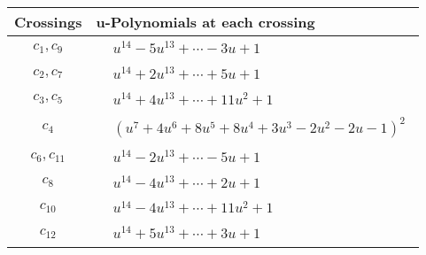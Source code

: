\documentclass[1p]{elsarticle_modified}
\theoremstyle{definition}
\begin{document}
\begin{tabular}{m{50pt}|m{274pt}}
Crossings & \hspace{64pt}u-Polynomials at each crossing \\
\hline $$\begin{aligned}c_{1},c_{9}\end{aligned}$$&$\begin{aligned}
&u^{14}-5 u^{13}+\cdots-3 u+1
\end{aligned}$\\
\hline $$\begin{aligned}c_{2},c_{7}\end{aligned}$$&$\begin{aligned}
&u^{14}+2 u^{13}+\cdots+5 u+1
\end{aligned}$\\
\hline $$\begin{aligned}c_{3},c_{5}\end{aligned}$$&$\begin{aligned}
&u^{14}+4 u^{13}+\cdots+11 u^2+1
\end{aligned}$\\
\hline $$\begin{aligned}c_{4}\end{aligned}$$&$\begin{aligned}
&(u^7+4 u^6+8 u^5+8 u^4+3 u^3-2 u^2-2 u-1)^2
\end{aligned}$\\
\hline $$\begin{aligned}c_{6},c_{11}\end{aligned}$$&$\begin{aligned}
&u^{14}-2 u^{13}+\cdots-5 u+1
\end{aligned}$\\
\hline $$\begin{aligned}c_{8}\end{aligned}$$&$\begin{aligned}
&u^{14}-4 u^{13}+\cdots+2 u+1
\end{aligned}$\\
\hline $$\begin{aligned}c_{10}\end{aligned}$$&$\begin{aligned}
&u^{14}-4 u^{13}+\cdots+11 u^2+1
\end{aligned}$\\
\hline $$\begin{aligned}c_{12}\end{aligned}$$&$\begin{aligned}
&u^{14}+5 u^{13}+\cdots+3 u+1
\end{aligned}$\\
\hline
\end{tabular}\\~\\
\end{document}
